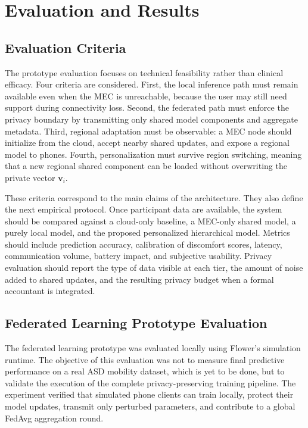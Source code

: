 \documentclass[lettersize,journal]{IEEEtran}
\begin{document}
\section{Evaluation and Results}

\subsection{Evaluation Criteria}

The prototype evaluation focuses on technical feasibility rather than
clinical efficacy. Four criteria are considered. First, the local
inference path must remain available even when the MEC is unreachable,
because the user may still need support during connectivity loss.
Second, the federated path must enforce the privacy boundary by
transmitting only shared model components and aggregate metadata. Third,
regional adaptation must be observable: a MEC node should initialize
from the cloud, accept nearby shared updates, and expose a regional
model to phones. Fourth, personalization must survive region switching,
meaning that a new regional shared component can be loaded without
overwriting the private vector $\mathbf{v}_i$.

These criteria correspond to the main claims of the architecture. They
also define the next empirical protocol. Once participant data are
available, the system should be compared against a cloud-only baseline,
a MEC-only shared model, a purely local model, and the proposed
personalized hierarchical model. Metrics should include prediction
accuracy, calibration of discomfort scores, latency, communication
volume, battery impact, and subjective usability. Privacy evaluation
should report the type of data visible at each tier, the amount of noise
added to shared updates, and the resulting privacy budget when a formal
accountant is integrated.

\subsection{Federated Learning Prototype Evaluation}

The federated learning prototype was evaluated locally using Flower's
simulation runtime. The objective of this evaluation was not to measure
final predictive performance on a real ASD mobility dataset, which is yet to be done, but to validate the execution of the complete
privacy-preserving training pipeline. The experiment verified that
simulated phone clients can train locally, protect their model updates,
transmit only perturbed parameters, and contribute to a global FedAvg
aggregation round.
\end{document}
